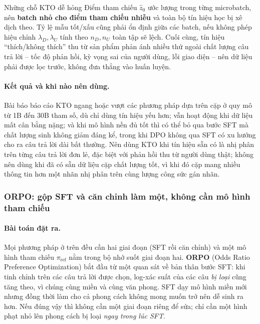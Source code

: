 \begin{pitfall}{Những chỗ KTO dễ hỏng}
Điểm tham chiếu \( \hat{z}_0 \) ước lượng trong từng microbatch, nên \textbf{batch nhỏ cho điểm tham chiếu nhiễu} và toàn bộ tín hiệu học bị xê dịch theo. Tỷ lệ mẫu tốt/xấu cũng phải ổn định giữa các batch, nếu không phép hiệu chỉnh \( \lambda_D, \lambda_U \) tính theo \( n_D, n_U \) toàn tập sẽ lệch. Cuối cùng, tín hiệu ``thích/không thích'' thu từ sản phẩm phản ánh nhiều thứ ngoài chất lượng câu trả lời -- tốc độ phản hồi, kỳ vọng sai của người dùng, lỗi giao diện -- nên dữ liệu phải được lọc trước, không đưa thẳng vào huấn luyện.
\end{pitfall}

\paragraph{Kết quả và khi nào nên dùng.} Bài báo báo cáo KTO ngang hoặc vượt các phương pháp dựa trên cặp ở quy mô từ 1B đến 30B tham số, dù chỉ dùng tín hiệu yếu hơn; vẫn hoạt động khi dữ liệu mất cân bằng nặng; và khi mô hình nền đủ tốt thì có thể bỏ qua bước SFT mà chất lượng sinh không giảm đáng kể, trong khi DPO không qua SFT có xu hướng cho ra câu trả lời dài bất thường. Nên dùng KTO khi tín hiệu sẵn có là nhị phân trên từng câu trả lời đơn lẻ, đặc biệt với phản hồi thu từ người dùng thật; không nên dùng khi đã có sẵn dữ liệu cặp chất lượng tốt, vì khi đó cặp mang nhiều thông tin hơn một nhãn nhị phân trên cùng lượng công sức gán nhãn.

\subsubsection{ORPO: gộp SFT và căn chỉnh làm một, không cần mô hình tham chiếu}
\label{ssec:orpo}

\paragraph{Bài toán đặt ra.} Mọi phương pháp ở trên đều cần hai giai đoạn (SFT rồi căn chỉnh) và một mô hình tham chiếu \( \pi_{\text{ref}} \) nằm trong bộ nhớ suốt giai đoạn hai. \textbf{ORPO} (Odds Ratio Preference Optimization) \cite{hong2024orpo} bắt đầu từ một quan sát về bản thân bước SFT: khi tinh chỉnh trên các câu trả lời được chọn, log-xác suất của các câu \emph{bị loại} cũng tăng theo, vì chúng cùng miền và cùng văn phong. SFT dạy mô hình miền mới nhưng đồng thời làm cho cả phong cách không mong muốn trở nên dễ sinh ra hơn. Nếu đúng vậy thì không cần một giai đoạn riêng để sửa; chỉ cần một hình phạt nhỏ lên phong cách bị loại \emph{ngay trong lúc SFT}.

